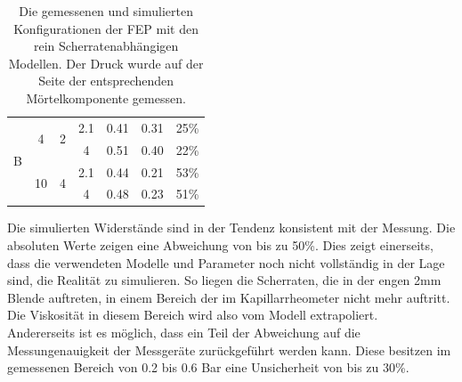 \begin{table}[tb]
{\begin{tabular}{l c c c r r r}
    \hline
    \hline
    \multirow{4}{*}{\re{} B} &  \multirow{2}{*}{4} & \multirow{2}{*}{2}  & 2.1 & 0.41 & 0.31 &25\%\\
                                                    \cline{4-7}
                              &                     &                    & 4   & 0.51 & 0.40 &22\%\\
                              \cline{2-7}
                              & \multirow{2}{*}{10} & \multirow{2}{*}{4} & 2.1 & 0.44 & 0.21 &53\%\\
                                                    \cline{4-7}
                              &                     &                    & 4   & 0.48 & 0.23 &51\%\\
    \hline\hline
\end{tabular}}
    \caption{Die gemessenen und simulierten Konfigurationen der FEP mit den rein Scherratenabhängigen Modellen. Der Druck wurde auf der Seite der entsprechenden Mörtelkomponente gemessen.}
    \label{fig:fepVergleich}
\end{table}

Die simulierten Widerstände sind in der Tendenz konsistent mit der Messung. Die absoluten Werte zeigen eine Abweichung von bis zu 50\%. Dies zeigt einerseits, dass die verwendeten Modelle und Parameter noch nicht vollständig in der Lage sind, die Realität zu simulieren. So liegen die Scherraten, die in der engen 2mm Blende auftreten, in einem Bereich der im Kapillarrheometer nicht mehr auftritt. Die Viskosität in diesem Bereich wird also vom Modell extrapoliert.\\
Andererseits ist es möglich, dass ein Teil der Abweichung auf die Messungenauigkeit der Messgeräte zurückgeführt werden kann. Diese besitzen im gemessenen Bereich von 0.2 bis 0.6 Bar eine Unsicherheit von bis zu 30\%.
%
